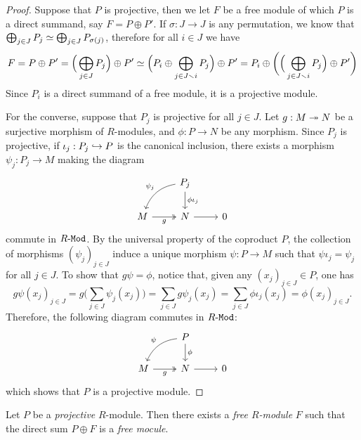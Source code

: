 \begin{proof}
    Suppose that \(P\) is projective, then we let \(F\) be a free module of which
    \(P\) is a direct summand, say \(F = P \oplus P'\). If \(\sigma: J \to J\) is
    any permutation, we know that \(\bigoplus_{j \in J} P_j \simeq
    \bigoplus_{j \in J} P_{\sigma(j)}\), therefore for all \(i \in J\) we have
    \[
        F = P \oplus P' = \Big( \bigoplus_{j \in J} P_j \Big) \oplus P'
        \simeq \Big( P_i \oplus \bigoplus_{j \in J \smallsetminus i} P_j \Big) \oplus P'
        = P_i \oplus \bigg(\Big(\bigoplus_{j \in J \smallsetminus i} P_j \Big) \oplus P'\bigg)
    \]
    Since \(P_i\) is a direct summand of a free module, it is a projective module.

    For the converse, suppose that \(P_j\) is projective for all \(j \in J\). Let
    \(g: M \twoheadrightarrow N\) be a surjective morphism of \(R\)-modules, and \(\phi: P \to N\)
    be any morphism. Since \(P_j\) is projective, if \(\iota_j: P_j \hookrightarrow P\) is the
    canonical inclusion, there exists a morphism \(\psi_j: P_j \to M\) making the
    diagram
    \[
        \begin{tikzcd}
            &P_j \ar[d, "\phi \iota_j"] \ar[dl, bend right, "\psi_j"'] &\\
            M \ar[r, two heads, "g"'] &N \ar[r] &0
        \end{tikzcd}
    \]
    commute in \({R\text{-}\texttt{Mod}}\). By the universal property of the coproduct \(P\), the
    collection of morphisms \((\psi_j)_{j \in J}\) induce a unique morphism \(\psi:
    P \to M\) such that \(\psi \iota_j = \psi_j\) for all \(j \in J\). To show that
    \(g \psi = \phi\), notice that, given any \((x_j)_{j \in J} \in P\), one has
    \[
        g \psi(x_j)_{j \in J} = g \Big(\sum_{j \in J} \psi_j(x_j)\Big)
        = \sum_{j \in J} g \psi_j(x_j)
        = \sum_{j \in J} \phi \iota_j(x_j)
        = \phi(x_j)_{j \in J}.
    \]
    Therefore, the following diagram commutes in \({R\text{-}\texttt{Mod}}\):
    \[
        \begin{tikzcd}
            &P \ar[d, "\phi"] \ar[dl, bend right, "\psi"'] &\\
            M \ar[r, two heads, "g"'] &N \ar[r] &0
        \end{tikzcd}
    \]
    which shows that \(P\) is a projective module.
\end{proof}

\begin{proposition}
    \label{prop:eilenberg-trick}
    Let \(P\) be a \emph{projective} \(R\)-module. Then there exists a \emph{free
        \(R\)-module} \(F\) such that the direct sum \(P \oplus F\) is a \emph{free
        mocule}.
\end{proposition}

